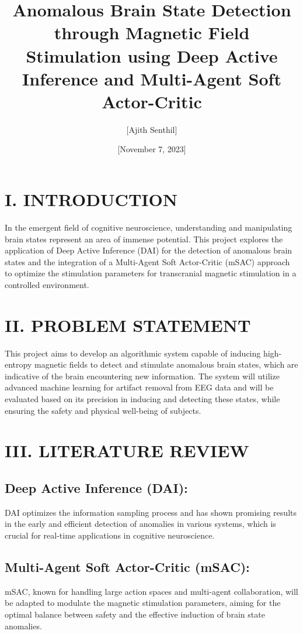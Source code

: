 \documentclass{article}
\title{Anomalous Brain State Detection through Magnetic Field Stimulation using Deep Active Inference and Multi-Agent Soft Actor-Critic}
\author{[Ajith Senthil]}
\date{[November 7, 2023]}
\begin{document}
\maketitle

\section*{I. INTRODUCTION}
In the emergent field of cognitive neuroscience, understanding and manipulating brain states represent an area of immense potential. This project explores the application of Deep Active Inference (DAI) for the detection of anomalous brain states and the integration of a Multi-Agent Soft Actor-Critic (mSAC) approach to optimize the stimulation parameters for transcranial magnetic stimulation in a controlled environment.

\section*{II. PROBLEM STATEMENT}
This project aims to develop an algorithmic system capable of inducing high-entropy magnetic fields to detect and stimulate anomalous brain states, which are indicative of the brain encountering new information. The system will utilize advanced machine learning for artifact removal from EEG data and will be evaluated based on its precision in inducing and detecting these states, while ensuring the safety and physical well-being of subjects.

\section*{III. LITERATURE REVIEW}
\subsection*{Deep Active Inference (DAI):}
DAI optimizes the information sampling process and has shown promising results in the early and efficient detection of anomalies in various systems, which is crucial for real-time applications in cognitive neuroscience.

\subsection*{Multi-Agent Soft Actor-Critic (mSAC):}
mSAC, known for handling large action spaces and multi-agent collaboration, will be adapted to modulate the magnetic stimulation parameters, aiming for the optimal balance between safety and the effective induction of brain state anomalies.
\end{document}
